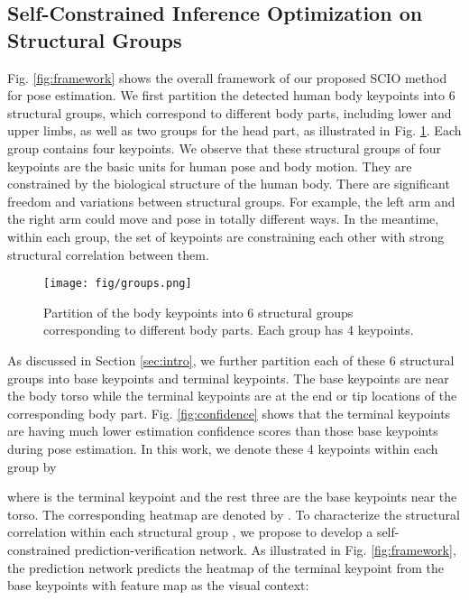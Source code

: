 \documentclass[runningheads]{llncs}
\begin{document}
\subsection{Self-Constrained Inference Optimization on Structural Groups}
\label{sec:overview}
Fig. \ref{fig:framework} shows the overall framework of our proposed SCIO method for pose estimation. 
We first partition the detected human body keypoints into 6 structural groups, which correspond to different body parts, including lower and upper limbs, as well as two groups for the head part, as illustrated in Fig. \ref{fig:groups}.
Each group contains four keypoints. We observe that these structural groups of four keypoints are the basic units for human pose and body motion. They are constrained by the biological structure of the human body.  There are significant freedom and variations between structural groups. For example, the left arm and the right arm could move and pose in totally different ways. In the meantime, within each group, the set of keypoints are constraining each other with strong structural correlation between them. 

\begin{figure}[h]
\centering
\setlength{\abovecaptionskip}{-0.05cm} 
\texttt{[image: fig/groups.png]}
\centering
\caption{Partition of the body keypoints into 6 structural groups corresponding to different body parts. Each group has 4 keypoints.}
\label{fig:groups}
\end{figure}


As discussed in Section \ref{sec:intro}, we further partition each of these 6 structural groups into base keypoints and terminal keypoints. The base keypoints are near the body torso while the terminal keypoints are at the end or tip locations of the corresponding body part. 
Fig. \ref{fig:confidence} shows that the terminal keypoints are having much lower estimation confidence scores than those base keypoints during pose estimation. 
In this work, we denote these 4 keypoints within each group by  
 
where  is the terminal keypoint and the rest three  are the base keypoints near the torso. 
The corresponding heatmap are denoted by 
. 
To characterize the structural correlation within each structural group  , we propose to develop a self-constrained prediction-verification network. As illustrated in Fig. \ref{fig:framework}, the prediction network  predicts the 
heatmap of the terminal keypoint  from the base keypoints 
 with  feature map  as the visual context:
\end{document}
